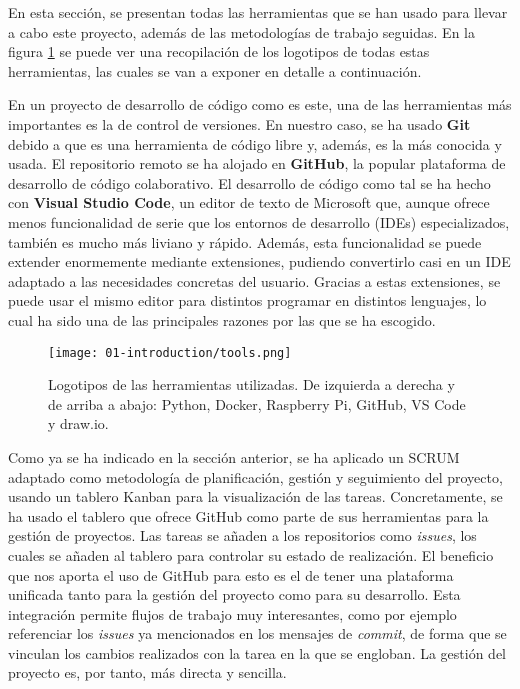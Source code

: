 En esta sección, se presentan todas las herramientas que se han usado para
llevar a cabo este proyecto, además de las metodologías de trabajo seguidas. En
la figura \ref{fig:01-tools} se puede ver una recopilación de los logotipos de
todas estas herramientas, las cuales se van a exponer en detalle a continuación.

En un proyecto de desarrollo de código como es este, una de las herramientas más
importantes es la de control de versiones. En nuestro caso, se ha usado
\textbf{Git} debido a que es una herramienta de código libre y, además, es la
más conocida y usada. El repositorio remoto se ha alojado en \textbf{GitHub}, la
popular plataforma de desarrollo de código colaborativo. El desarrollo de código
como tal se ha hecho con \textbf{Visual Studio Code}, un editor de texto de
Microsoft que, aunque ofrece menos funcionalidad de serie que los entornos de
desarrollo (IDEs) especializados, también es mucho más liviano y rápido. Además,
esta funcionalidad se puede extender enormemente mediante extensiones, pudiendo
convertirlo casi en un IDE adaptado a las necesidades concretas del usuario.
Gracias a estas extensiones, se puede usar el mismo editor para distintos
programar en distintos lenguajes, lo cual ha sido una de las principales razones
por las que se ha escogido.

\begin{figure}[H]
      \centering
      \texttt{[image: 01-introduction/tools.png]}
      \caption{Logotipos de las herramientas utilizadas. De izquierda a derecha
            y de arriba a abajo: Python, Docker, Raspberry Pi, GitHub, VS Code y
            draw.io.}
      \label{fig:01-tools}
\end{figure}

Como ya se ha indicado en la sección anterior, se ha aplicado un SCRUM adaptado
como metodología de planificación, gestión y seguimiento del proyecto, usando un
tablero Kanban para la visualización de las tareas. Concretamente, se ha usado
el tablero que ofrece GitHub como parte de sus herramientas para la gestión de
proyectos. Las tareas se añaden a los repositorios como \textit{issues}, los
cuales se añaden al tablero para controlar su estado de realización. El
beneficio que nos aporta el uso de GitHub para esto es el de tener una
plataforma unificada tanto para la gestión del proyecto como para su desarrollo.
Esta integración permite flujos de trabajo muy interesantes, como por ejemplo
referenciar los \textit{issues} ya mencionados en los mensajes de
\textit{commit}, de forma que se vinculan los cambios realizados con la tarea en
la que se engloban. La gestión del proyecto es, por tanto, más directa y
sencilla.

